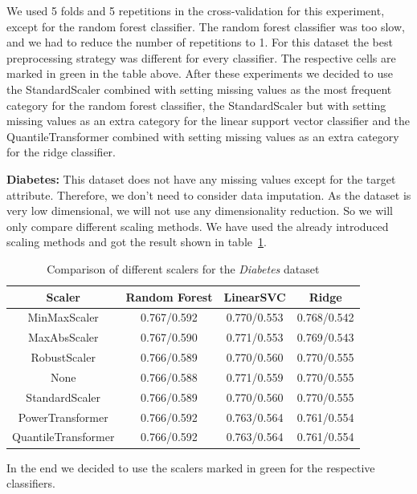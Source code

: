 \documentclass[a4paper,10pt]{article}
\begin{document}
We used 5 folds and 5 repetitions in the cross-validation for this experiment, except for the random forest
classifier. The random forest classifier was too slow, and we had to reduce the number of repetitions to 1.
For this dataset the best
preprocessing strategy was different for every classifier. The respective cells are marked in green in the
table above. After these experiments we decided to use the StandardScaler combined with setting missing
values as the most frequent category for the random forest classifier, the StandardScaler but with setting
missing values as an extra category for the linear support vector classifier and the QuantileTransformer
combined with setting missing values as an extra category for the ridge classifier.

\textbf{Diabetes:} This dataset does not have any missing values except for the target attribute. Therefore, we 
 don't need to consider data imputation. As the dataset is very low dimensional, we will not use any dimensionality reduction. 
 So we will only compare different scaling methods. We have used the already introduced scaling methods 
 and got the result shown in table~\ref{table:diabetesscalers}.
 \begin{table}[h!]
\centering
\begin{tabular}{|c|c|c|c|}
\hline
\textbf{Scaler} & \textbf{Random Forest } & \textbf{LinearSVC } & \textbf{Ridge } \\
\hline
MinMaxScaler & \cellcolor[HTML]{C1E1C1}0.767/0.592 & 0.770/0.553 & 0.768/0.542 \\
\hline
MaxAbsScaler & 0.767/0.590 & 0.771/0.553 & 0.769/0.543 \\
\hline
RobustScaler & 0.766/0.589 & 0.770/0.560 & 0.770/0.555 \\
\hline
None & 0.766/0.588 & \cellcolor[HTML]{C1E1C1}0.771/0.559 & 0.770/0.555 \\
\hline
StandardScaler & 0.766/0.589 & 0.770/0.560 & \cellcolor[HTML]{C1E1C1}0.770/0.555 \\
\hline
PowerTransformer & 0.766/0.592 & 0.763/0.564 & 0.761/0.554 \\
\hline
QuantileTransformer & 0.766/0.592 & 0.763/0.564 & 0.761/0.554 \\
\hline
\end{tabular}
\caption{Comparison of different scalers for the \textit{Diabetes} dataset}
\label{table:diabetesscalers}
\end{table}
In the end we decided to use the scalers marked in green for the respective classifiers.\\
\end{document}
